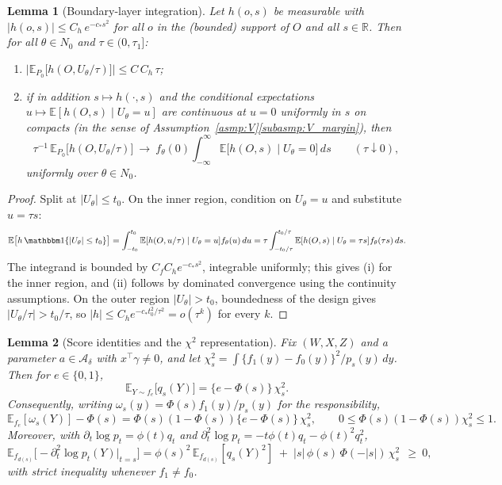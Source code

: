 \documentclass[11pt]{article}
\newtheorem{lemma}{Lemma}
\theoremstyle{definition}
\theoremstyle{plain}
\newcommand{\E}{\mathbb{E}}
\newcommand{\R}{\mathbb{R}}
\begin{document}
\begin{lemma}[Boundary-layer integration]
\label{lem:boundary_layer_integration}
Let $h(o,s)$ be measurable with $|h(o,s)|\le C_h\,e^{-c_*s^2}$ for all $o$ in the (bounded) support of $O$ and all $s\in\R$. Then for all $\theta\in N_0$ and $\tau\in(0,\tau_1]$:
\begin{enumerate}[label=(\roman*),nosep]
\item $\big|\E_{P_0}\big[h(O,U_\theta/\tau)\big]\big|\le C\,C_h\,\tau$;
\item if in addition $s\mapsto h(\cdot,s)$ and the conditional expectations $u\mapsto\E[h(O,s)\mid U_\theta=u]$ are continuous at $u=0$ uniformly in $s$ on compacts (in the sense of Assumption~\ref{asmp:V}\ref{subasmp:V_margin}), then
\[
\tau^{-1}\,\E_{P_0}\big[h(O,U_\theta/\tau)\big]\ \longrightarrow\ f_\theta(0)\int_{-\infty}^{\infty}\E\big[h(O,s)\mid U_\theta=0\big]\,ds
\qquad(\tau\downarrow0),
\]
uniformly over $\theta\in N_0$.
\end{enumerate}
\end{lemma}

\begin{proof}
Split at $|U_\theta|\le t_0$. On the inner region, condition on $U_\theta=u$ and substitute $u=\tau s$:
\[
\E\big[h\,\mathbbm 1\{|U_\theta|\le t_0\}\big]
=\int_{-t_0}^{t_0}\E[h(O,u/\tau)\mid U_\theta=u]f_\theta(u)\,du
=\tau\int_{-t_0/\tau}^{t_0/\tau}\E[h(O,s)\mid U_\theta=\tau s]f_\theta(\tau s)\,ds .
\]
The integrand is bounded by $C_fC_he^{-c_*s^2}$, integrable uniformly; this gives (i) for the inner region, and (ii) follows by dominated convergence using the continuity assumptions. On the outer region $|U_\theta|>t_0$, boundedness of the design gives $|U_\theta/\tau|>t_0/\tau$, so $|h|\le C_he^{-c_*t_0^2/\tau^2}=o(\tau^k)$ for every $k$.
\end{proof}

\begin{lemma}[Score identities and the $\chi^2$ representation]
\label{lem:conditional_score_gate_mismatch_new}
Fix $(W,X,Z)$ and a parameter $a\in\mathcal A_\delta$ with $x^\top\gamma\ne0$, and let
$\chi^2_s=\int\{f_1(y)-f_0(y)\}^2/p_s(y)\,dy$. Then for $e\in\{0,1\}$,
\begin{equation}
\E_{Y\sim f_e}\big[q_s(Y)\big]=\{e-\Phi(s)\}\,\chi^2_s .
\label{eq:chisq_identity_app}
\end{equation}
Consequently, writing $\omega_s(y)=\Phi(s)f_1(y)/p_s(y)$ for the responsibility,
\[
\E_{f_e}[\omega_s(Y)]-\Phi(s)=\Phi(s)(1-\Phi(s))\{e-\Phi(s)\}\,\chi^2_s ,
\qquad
0\le\Phi(s)(1-\Phi(s))\chi^2_s\le1 .
\]
Moreover, with $\partial_t\log p_t=\phi(t)q_t$ and $\partial^2_t\log p_t=-t\phi(t)q_t-\phi(t)^2q_t^2$,
\begin{equation}
\E_{f_{d(s)}}\big[-\partial^2_t\log p_t(Y)\big|_{t=s}\big]
=\phi(s)^2\,\E_{f_{d(s)}}[q_s(Y)^2]\;+\;|s|\,\phi(s)\,\Phi(-|s|)\,\chi^2_s\ \ \ge\ 0 ,
\label{eq:pointwise_info_positivity}
\end{equation}
with strict inequality whenever $f_1\neq f_0$.
\end{lemma}
\end{document}
